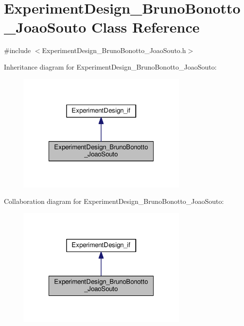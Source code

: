 \hypertarget{class_experiment_design___bruno_bonotto___joao_souto}{\section{Experiment\-Design\-\_\-\-Bruno\-Bonotto\-\_\-\-Joao\-Souto Class Reference}
\label{class_experiment_design___bruno_bonotto___joao_souto}
}


{\ttfamily \#include $<$Experiment\-Design\-\_\-\-Bruno\-Bonotto\-\_\-\-Joao\-Souto.\-h$>$}



Inheritance diagram for Experiment\-Design\-\_\-\-Bruno\-Bonotto\-\_\-\-Joao\-Souto\-:
\nopagebreak
\begin{figure}[H]
\begin{center}
\leavevmode
\includegraphics[width=240pt]{class_experiment_design___bruno_bonotto___joao_souto__inherit__graph}
\end{center}
\end{figure}


Collaboration diagram for Experiment\-Design\-\_\-\-Bruno\-Bonotto\-\_\-\-Joao\-Souto\-:
\nopagebreak
\begin{figure}[H]
\begin{center}
\leavevmode
\includegraphics[width=240pt]{class_experiment_design___bruno_bonotto___joao_souto__coll__graph}
\end{center}
\end{figure}
